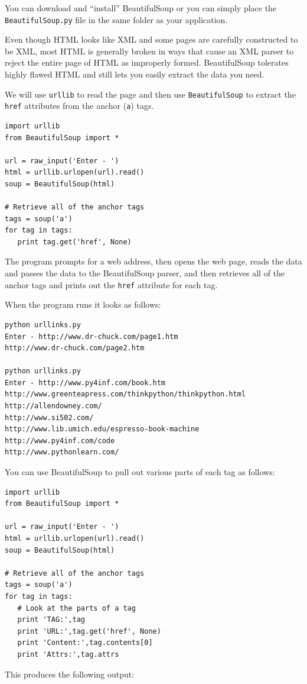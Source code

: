 \documentclass[10pt]{book}
\begin{document}
You can download and ``install'' BeautifulSoup or you 
can simply place the {\tt BeautifulSoup.py} file in the
same folder as your application.

Even though HTML looks like XML and some pages are carefully 
constructed to be XML, most HTML is generally broken in ways
that cause an XML parser to reject the entire page of HTML as
improperly formed.  BeautifulSoup tolerates highly flawed 
HTML and still lets you easily extract the data you need.

We will use {\tt urllib} to read the page and then use
{\tt BeautifulSoup} to extract the {\tt href} attributes from the
anchor ({\tt a}) tags.

\beforeverb
\begin{verbatim}
import urllib
from BeautifulSoup import *

url = raw_input('Enter - ')
html = urllib.urlopen(url).read()
soup = BeautifulSoup(html)

# Retrieve all of the anchor tags
tags = soup('a')
for tag in tags:
   print tag.get('href', None)
\end{verbatim}
\afterverb
%
The program prompts for a web address, then opens the web
page, reads the data and passes the data to the BeautifulSoup
parser, and then retrieves all of the anchor tags and prints
out the {\tt href} attribute for each tag.

When the program runs it looks as follows:

\beforeverb
\begin{verbatim}
python urllinks.py 
Enter - http://www.dr-chuck.com/page1.htm
http://www.dr-chuck.com/page2.htm

python urllinks.py 
Enter - http://www.py4inf.com/book.htm
http://www.greenteapress.com/thinkpython/thinkpython.html
http://allendowney.com/
http://www.si502.com/
http://www.lib.umich.edu/espresso-book-machine
http://www.py4inf.com/code
http://www.pythonlearn.com/
\end{verbatim}
\afterverb
%
You can use BeautifulSoup to pull out various parts of each 
tag as follows:
\beforeverb
\begin{verbatim}
import urllib
from BeautifulSoup import *

url = raw_input('Enter - ')
html = urllib.urlopen(url).read()
soup = BeautifulSoup(html)

# Retrieve all of the anchor tags
tags = soup('a')
for tag in tags:
   # Look at the parts of a tag
   print 'TAG:',tag
   print 'URL:',tag.get('href', None)
   print 'Content:',tag.contents[0]
   print 'Attrs:',tag.attrs
\end{verbatim}
\afterverb
%
This produces the following output:
\end{document}
